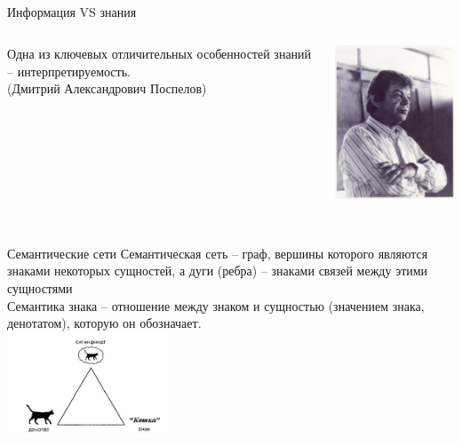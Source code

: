 \begin{frame}{\\Информация VS знания}
	\vspace{10mm}
	\begin{columns}[T,onlytextwidth]
		\begin{column}{0.5\textwidth}
			\vspace{20mm}
			Одна из ключевых отличительных особенностей знаний – интерпретируемость. \\
			(Дмитрий Александрович Поспелов)
		\end{column}
		\begin{column}{0.5\textwidth}
			\includegraphics[width=50mm]{./part1/pictures/sc-code-pospelov.jpg}
		\end{column}
	\end{columns}
\end{frame}


\begin{frame}{\\Семантические сети}
	Семантическая сеть -- граф, вершины которого являются знаками некоторых сущностей, а дуги (ребра) – знаками связей между этими сущностями
	\\
	Семантика знака -- отношение между знаком и сущностью (значением знака, денотатом), которую он обозначает.
	\\
	\includegraphics[width=50mm]{./part1/pictures/sc-code-cat.jpg}
\end{frame}
